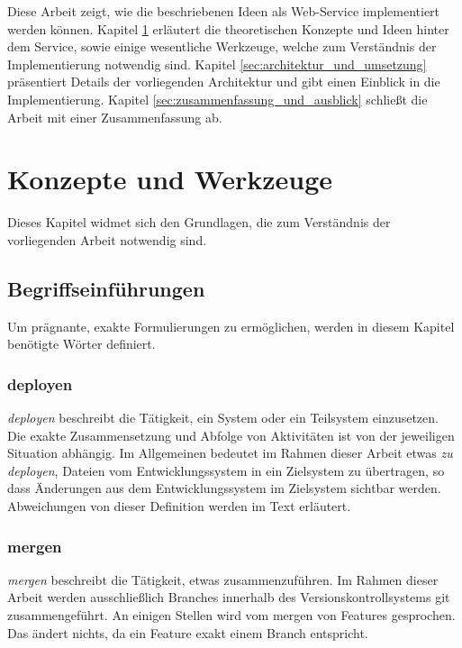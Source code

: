 Diese Arbeit zeigt, wie die beschriebenen Ideen als Web-Service implementiert werden können. Kapitel \ref{sec:konzepte_und_werkzeuge} erläutert die theoretischen Konzepte und Ideen hinter dem Service, sowie einige wesentliche Werkzeuge, welche zum Verständnis der Implementierung notwendig sind. Kapitel \ref{sec:architektur_und_umsetzung} präsentiert Details der vorliegenden Architektur und gibt einen Einblick in die Implementierung. Kapitel \ref{sec:zusammenfassung_und_ausblick} schließt die Arbeit mit einer Zusammenfassung ab.


\section{Konzepte und Werkzeuge} %
\label{sec:konzepte_und_werkzeuge}

Dieses Kapitel widmet sich den Grundlagen, die zum Verständnis der vorliegenden Arbeit notwendig sind.

\subsection{Begriffseinführungen} %
\label{sub:begriffseinfuehrungen}

Um prägnante, exakte Formulierungen zu ermöglichen, werden in diesem Kapitel benötigte Wörter definiert.

\subsubsection{deployen} %
\label{ssub:deployen}
\emph{deployen} beschreibt die Tätigkeit, ein System oder ein Teilsystem einzusetzen. Die exakte Zusammensetzung und Abfolge von Aktivitäten ist von der jeweiligen Situation abhängig. Im Allgemeinen bedeutet im Rahmen dieser Arbeit etwas \emph{zu deployen}, Dateien vom Entwicklungssystem in ein Zielsystem zu übertragen, so dass Änderungen aus dem Entwicklungssystem im Zielsystem sichtbar werden. Abweichungen von dieser Definition werden im Text erläutert.

\subsubsection{mergen} %
\label{ssub:mergen}
\emph{mergen} beschreibt die Tätigkeit, etwas zusammenzuführen. Im Rahmen dieser Arbeit werden ausschließlich Branches innerhalb des Versionskontrollsystems git zusammengeführt. An einigen Stellen wird vom mergen von Features gesprochen. Das ändert nichts, da ein Feature exakt einem Branch entspricht.

